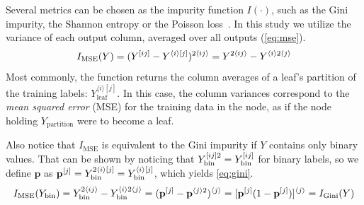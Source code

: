 Several metrics can be chosen as the impurity function $I(\cdot)$, such as the Gini impurity, the Shannon entropy or the Poisson loss~\cite{breiman1984classification}.  %
In this study we utilize the variance of each output column, averaged over all outputs (\autoref{eq:mse}). 
%
%
\begin{equation}
    I_\text{MSE}(Y)
        = (Y^{[ij]} - Y^{\langle i\rangle[j]})^{2\langle ij\rangle}
        = Y^{2\langle ij\rangle} - Y^{\langle i\rangle 2\langle j\rangle}
    \label{eq:mse}
\end{equation}
%
Most commonly, the  function returns the column averages of a leaf's partition of the training labels: $Y_\text{leaf}^{\langle i\rangle[j]}$.
In this case, the column variances correspond to the \emph{mean squared error} (MSE) for the training data in the node, as if the node holding $Y_\text{partition}$ were to become a leaf.
%
%

Also notice that $I_\text{MSE}$ is equivalent to the Gini impurity if $Y$ contains only binary values. That can be shown by noticing that $Y_\text{bin}^{[ij]2} = Y_\text{bin}^{[ij]}$ for binary labels, so we define $\mathbf{p}$ as $\mathbf{p}^{[j]} = Y_\text{bin}^{2\langle i\rangle[j]}=Y_\text{bin}^{\langle i\rangle [j]}$, which yields \autoref{eq:gini}.
%
\begin{equation}
    I_\text{MSE}(Y_\text{bin})
        = Y_\text{bin}^{2\langle ij\rangle} - Y_\text{bin}^{\langle i\rangle2\langle j\rangle}
        = (\mathbf{p}^{[j]}  - \mathbf{p}^{\langle j\rangle 2})^{\langle j \rangle}
        = [\mathbf{p}^{[j]}(1 - \mathbf{p}^{[j]})]^{\langle j \rangle}
    = I_\text{Gini}(Y)
    \label{eq:gini}
\end{equation}

